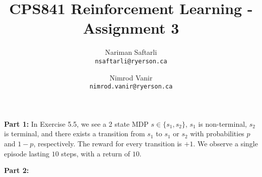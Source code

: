 \documentclass{article}
\title{CPS841 Reinforcement Learning - Assignment 3}
\author{
	Nariman Saftarli\\
	\texttt{nsaftarli@ryerson.ca}
	\and
	Nimrod Vanir\\
	\texttt{nimrod.vanir@ryerson.ca}
	}
\begin{document}
\maketitle
\newpage

\textbf{Part 1:} In Exercise 5.5, we see a 2 state MDP $s \in \{s_1, s_2\}$, $s_1$ is non-terminal, $s_2$ is terminal, and there exists a transition from $s_1$ to $s_1$ or $s_2$ with probabilities $p$ and $1-p$, respectively. The reward for every transition is $+1$. We observe a single episode lasting $10$ steps, with a return of $10$. 

\bigskip
\textbf{Part 2:}




	
	
\end{document}
